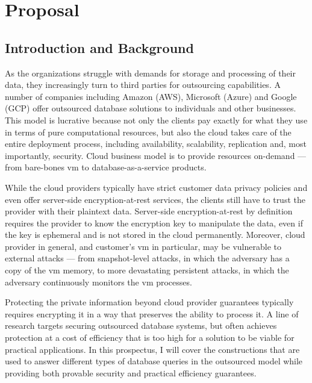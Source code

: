 \chapter{Proposal}
\thispagestyle{myheadings}

	\section{Introduction and Background}

		As the organizations struggle with demands for storage and processing of their data, they increasingly turn to third parties for outsourcing capabilities.
		A number of companies including Amazon (AWS), Microsoft (Azure) and Google (GCP) offer outsourced database solutions to individuals and other businesses.
		This model is lucrative because not only the clients pay exactly for what they use in terms of pure computational resources, but also the cloud takes care of the entire deployment process, including availability, scalability, replication and, most importantly, security.
		Cloud business model is to provide resources on-demand --- from bare-bones \acrshort{vm} to database-as-a-service products.

		While the cloud providers typically have strict customer data privacy policies and even offer server-side encryption-at-rest services, the clients still have to trust the provider with their plaintext data.
		Server-side encryption-at-rest by definition requires the provider to know the encryption key to manipulate the data, even if the key is ephemeral and is not stored in the cloud permanently.
		Moreover, cloud provider in general, and customer's \acrshort{vm} in particular, may be vulnerable to external attacks --- from snapshot-level attacks, in which the adversary has a copy of the \acrshort{vm} memory, to more devastating persistent attacks, in which the adversary continuously monitors the \acrshort{vm} processes.

		Protecting the private information beyond cloud provider guarantees typically requires encrypting it in a way that preserves the ability to process it.
		A line of research targets securing outsourced database systems, but often achieves protection at a cost of efficiency that is too high for a solution to be viable for practical applications.
		In this prospectus, I will cover the constructions that are used to answer different types of database queries in the outsourced model while providing both provable security and practical efficiency guarantees.

